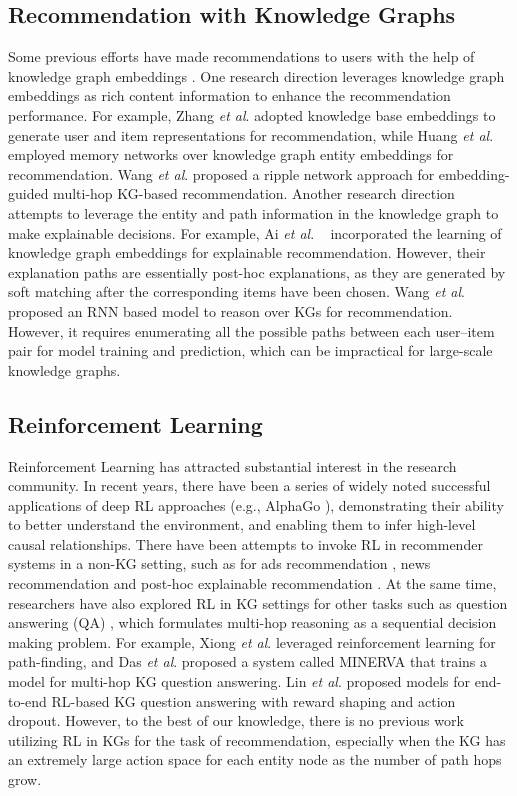 \documentclass[sigconf]{acmart}
\newcommand{\etal}{\textit{et al}. }
\begin{document}
\subsection{Recommendation with Knowledge Graphs}
Some previous efforts have made recommendations to users with the help of knowledge graph embeddings \cite{nickel2011three,bordes2013translating}. One research direction leverages knowledge graph embeddings as rich content information to enhance the recommendation performance. For example,
Zhang \etal \cite{zhang2016collaborativekdd} adopted knowledge base embeddings to generate user and item representations for recommendation, while Huang \etal \cite{huang2018improving} employed memory networks over knowledge graph entity embeddings for recommendation. Wang \etal \cite{wang2018ripplenet} proposed a ripple network approach for embedding-guided multi-hop KG-based recommendation. Another research direction attempts to leverage the entity and path information in the knowledge graph to make explainable decisions.
For example, Ai \etal~\cite{ai2018learning} incorporated the learning of knowledge graph embeddings for explainable recommendation. However, their explanation paths are essentially post-hoc explanations, as they are generated by soft matching after the corresponding items have been chosen.
Wang \etal \cite{wang2018explainable} proposed an RNN based model to reason over KGs for recommendation. However, it requires enumerating all the possible paths between each user--item pair for model training and prediction, which can be impractical for large-scale knowledge graphs.


\subsection{Reinforcement Learning}
Reinforcement Learning has attracted substantial interest in the research community. In recent years, there have been a series of widely noted successful applications of deep RL approaches (e.g., AlphaGo \cite{silver2016mastering}), demonstrating their ability to better understand the environment, and enabling them to infer high-level causal relationships.
There have been attempts to invoke RL in recommender systems in a non-KG setting, such as for ads recommendation \cite{theocharous2015personalized}, news recommendation \cite{zheng2018drn} and post-hoc explainable recommendation \cite{wang2018reinforcement}. %
At the same time, researchers have also explored RL in KG settings for other tasks such as question answering (QA) \cite{xiong2017deeppath,das2017go,lin2018multi}, which formulates multi-hop reasoning as a sequential decision making problem. 
For example, Xiong \etal \cite{xiong2017deeppath} leveraged reinforcement learning for path-finding, and Das \etal \cite{das2017go} proposed a system called MINERVA that trains a model for multi-hop KG question answering.
Lin \etal \cite{lin2018multi} proposed models for end-to-end RL-based KG question answering with reward shaping and action dropout. However, to the best of our knowledge, there is no previous work utilizing RL in KGs for the task of recommendation, especially when the KG has an extremely large action space for each entity node as the number of path hops grow.
\end{document}

